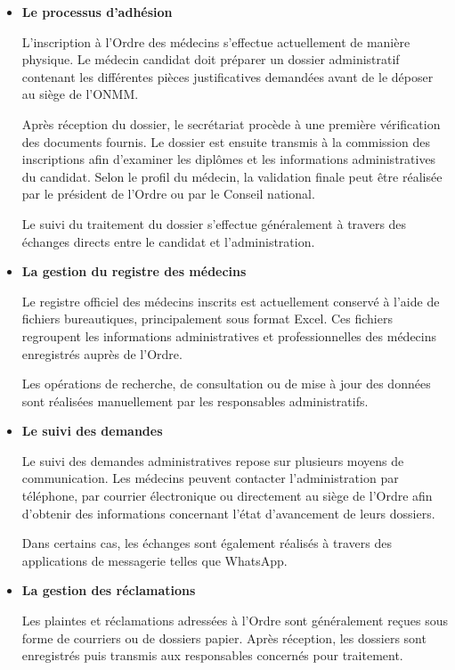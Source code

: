 ﻿\documentclass[12pt,a4paper]{report}
\begin{document}
\begin{itemize}

\item \textbf{Le processus d’adhésion}

L’inscription à l’Ordre des médecins s’effectue actuellement de manière
physique. Le médecin candidat doit préparer un dossier administratif
contenant les différentes pièces justificatives demandées avant de le
déposer au siège de l’ONMM.

Après réception du dossier, le secrétariat procède à une première
vérification des documents fournis. Le dossier est ensuite transmis à
la commission des inscriptions afin d’examiner les diplômes et les
informations administratives du candidat. Selon le profil du médecin,
la validation finale peut être réalisée par le président de l’Ordre ou
par le Conseil national.

Le suivi du traitement du dossier s’effectue généralement à travers des
échanges directs entre le candidat et l’administration.

\item \textbf{La gestion du registre des médecins}

Le registre officiel des médecins inscrits est actuellement conservé à
l’aide de fichiers bureautiques, principalement sous format Excel. Ces
fichiers regroupent les informations administratives et professionnelles
des médecins enregistrés auprès de l’Ordre.

Les opérations de recherche, de consultation ou de mise à jour des
données sont réalisées manuellement par les responsables administratifs.

\item \textbf{Le suivi des demandes}

Le suivi des demandes administratives repose sur plusieurs moyens de
communication. Les médecins peuvent contacter l’administration par
téléphone, par courrier électronique ou directement au siège de
l’Ordre afin d’obtenir des informations concernant l’état
d’avancement de leurs dossiers.

Dans certains cas, les échanges sont également réalisés à travers des
applications de messagerie telles que WhatsApp.

\item \textbf{La gestion des réclamations}

Les plaintes et réclamations adressées à l’Ordre sont généralement
reçues sous forme de courriers ou de dossiers papier. Après réception,
les dossiers sont enregistrés puis transmis aux responsables concernés
pour traitement.


\end{itemize}
\end{document}
